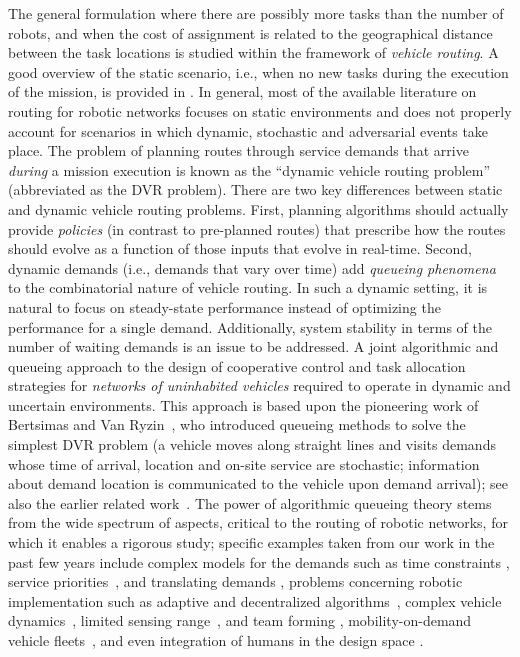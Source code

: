 The general formulation where there are possibly more tasks than the number of robots, and when the cost of assignment is related to the geographical distance between the task locations is studied within the framework of \emph{vehicle routing}. A good overview of the static scenario, i.e., when no new tasks during the execution of the mission, is provided in \cite{PT-DV:01}. In general, most of the available literature on
routing for robotic networks focuses on static environments and does not
properly account for scenarios in which dynamic, stochastic and adversarial
events take place. The problem of planning routes through service demands that arrive
\emph{during} a mission execution is known as the ``dynamic vehicle routing
problem'' (abbreviated as the DVR problem). There are two key differences between static and
dynamic vehicle routing problems. First, planning algorithms should
actually provide \emph{policies} (in contrast to pre-planned routes) that
prescribe how the routes should evolve as a function of those inputs that
evolve in real-time. Second, dynamic demands (i.e., demands that vary over
time) add \emph{queueing phenomena} to the combinatorial nature of vehicle
routing.  In such a dynamic setting, it is natural to focus on steady-state
performance instead of optimizing the performance for a single demand.
Additionally, system stability in terms of the number of waiting demands is
an issue to be addressed.
A joint algorithmic and queueing
approach to the design of cooperative control and task allocation
strategies for \emph{networks of uninhabited vehicles} required to operate
in dynamic and uncertain environments. This approach is based upon the
pioneering work of Bertsimas and Van Ryzin~\cite{Bertsimas.vanRyzin:91,Bertsimas.vanRyzin:93,Bertsimas.vanRyzin:93b}, who introduced queueing methods to solve the simplest DVR
problem (a vehicle moves along straight lines and visits demands whose time
of arrival, location and on-site service are stochastic; information about
demand location is communicated to the vehicle upon demand arrival); see
also the earlier related work~\cite{Psaraftis:88}. The power of algorithmic queueing theory stems from the wide
spectrum of aspects, critical to the routing of robotic networks, for which
it enables a rigorous study; specific examples taken from our work in the
past few years include complex models for the demands 
such as time
constraints
 \cite{Pavone.Bisnik.ea:MONE09, Pavone.Frazzoli:ICRA10}, service
priorities~\cite{Smith.Pavone:SIAM09}, and translating demands
\cite{Bopardikar.Smith.ea:10}, problems concerning robotic implementation such as
adaptive and decentralized algorithms~\cite{Pavone.Frazzoli.ea:11,
  Arsie.Savla.ea:TAC09}, complex vehicle dynamics~\cite{Savla.Frazzoli.ea:TAC08,
  Enright.Savla.ea:JGCD09}, limited sensing range~\cite{Enright.Frazzoli:06}, and team
forming \cite{Smith.Bullo:09}, mobility-on-demand vehicle fleets~\cite{Smith:2013fa}, and even integration of humans in the design
space \cite{Savla.Temple.ea:CDC08}.


